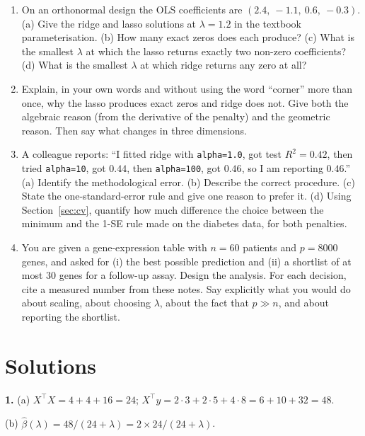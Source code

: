 \documentclass[11pt]{article}
\newcommand{\bhat}{\hat\beta}
\newcommand{\XtX}{X^{\!\top}\!X}
\newcommand{\Xty}{X^{\!\top}y}
\begin{document}
\begin{enumerate}[leftmargin=*]
  \item\label{q:soft} On an orthonormal design the OLS coefficients are
    $(2.4,\ -1.1,\ 0.6,\ -0.3)$. (a) Give the ridge and lasso solutions at
    $\lambda = 1.2$ in the textbook parameterisation. (b) How many exact zeros
    does each produce? (c) What is the smallest $\lambda$ at which the lasso
    returns exactly two non-zero coefficients? (d) What is the smallest
    $\lambda$ at which ridge returns any zero at all?

  \item\label{q:geom} Explain, in your own words and without using the word
    ``corner'' more than once, why the lasso produces exact zeros and ridge
    does not. Give both the algebraic reason (from the derivative of the
    penalty) and the geometric reason. Then say what changes in three
    dimensions.

  \item\label{q:cv} A colleague reports: ``I fitted ridge with
    \texttt{alpha=1.0}, got test $R^2 = 0.42$, then tried
    \texttt{alpha=10}, got $0.44$, then \texttt{alpha=100}, got $0.46$, so I
    am reporting $0.46$.'' (a) Identify the methodological error.
    (b) Describe the correct procedure. (c) State the one-standard-error rule
    and give one reason to prefer it. (d) Using
    Section~\ref{sec:cv}, quantify how much difference the choice between the
    minimum and the 1-SE rule made on the diabetes data, for both penalties.

  \item\label{q:design} You are given a gene-expression table with $n = 60$
    patients and $p = 8000$ genes, and asked for (i) the best possible
    prediction and (ii) a shortlist of at most $30$ genes for a follow-up
    assay. Design the analysis. For each decision, cite a measured number from
    these notes. Say explicitly what you would do about scaling, about
    choosing $\lambda$, about the fact that $p \gg n$, and about reporting the
    shortlist.
\end{enumerate}

\section{Solutions}
\label{sec:solutions}

\textbf{1.} (a) $\XtX = 4 + 4 + 16 = 24$;
$\Xty = 2\cdot3 + 2\cdot5 + 4\cdot8 = 6 + 10 + 32 = 48$.

(b) $\bhat(\lambda) = 48/(24 + \lambda) = 2 \times 24/(24+\lambda)$.
\end{document}

